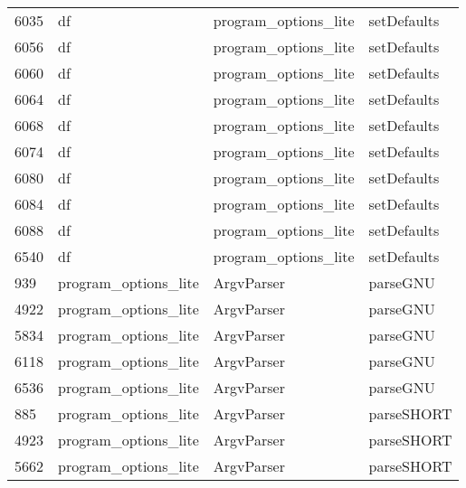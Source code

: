\begin{tabular}{llll}
6035 &                    df &       program\_options\_lite &                               setDefaults \\
6056 &                    df &       program\_options\_lite &                               setDefaults \\
6060 &                    df &       program\_options\_lite &                               setDefaults \\
6064 &                    df &       program\_options\_lite &                               setDefaults \\
6068 &                    df &       program\_options\_lite &                               setDefaults \\
6074 &                    df &       program\_options\_lite &                               setDefaults \\
6080 &                    df &       program\_options\_lite &                               setDefaults \\
6084 &                    df &       program\_options\_lite &                               setDefaults \\
6088 &                    df &       program\_options\_lite &                               setDefaults \\
6540 &                    df &       program\_options\_lite &                               setDefaults \\
939  &  program\_options\_lite &                 ArgvParser &                                  parseGNU \\
4922 &  program\_options\_lite &                 ArgvParser &                                  parseGNU \\
5834 &  program\_options\_lite &                 ArgvParser &                                  parseGNU \\
6118 &  program\_options\_lite &                 ArgvParser &                                  parseGNU \\
6536 &  program\_options\_lite &                 ArgvParser &                                  parseGNU \\
885  &  program\_options\_lite &                 ArgvParser &                                parseSHORT \\
4923 &  program\_options\_lite &                 ArgvParser &                                parseSHORT \\
5662 &  program\_options\_lite &                 ArgvParser &                                parseSHORT \\

\end{tabular}
